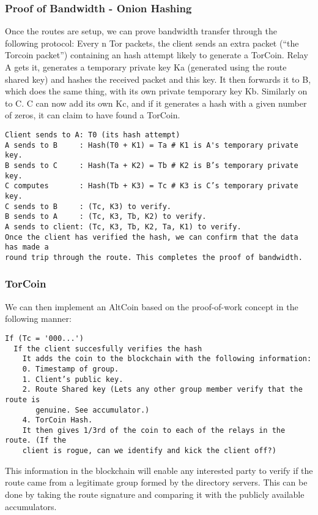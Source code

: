 \begin{enumerate}
\subsubsection{Proof of Bandwidth - Onion Hashing}
Once the routes are setup, we can prove bandwidth transfer through the following protocol:
Every n Tor packets, the client sends an extra packet (“the Torcoin packet”) containing an hash attempt likely to generate a TorCoin. Relay A gets it, generates a temporary private key Ka (generated using the route shared key) and hashes the received packet and this key. It then forwards it to B, which does the same thing, with its own private temporary key Kb. Similarly on to C. C can now add its own Kc, and if it generates a hash with a given number of zeros, it can claim to have found a TorCoin.
\begin{verbatim}
Client sends to A: T0 (its hash attempt)
A sends to B     : Hash(T0 + K1) = Ta # K1 is A's temporary private key.
B sends to C     : Hash(Ta + K2) = Tb # K2 is B’s temporary private key.
C computes       : Hash(Tb + K3) = Tc # K3 is C’s temporary private key.
C sends to B     : (Tc, K3) to verify.
B sends to A     : (Tc, K3, Tb, K2) to verify.
A sends to client: (Tc, K3, Tb, K2, Ta, K1) to verify.
Once the client has verified the hash, we can confirm that the data has made a 
round trip through the route. This completes the proof of bandwidth.
\end{verbatim}

\subsubsection{TorCoin}
We can then implement an AltCoin based on the proof-of-work concept in the following manner:
\begin{verbatim}
If (Tc = '000...')
  If the client succesfully verifies the hash
    It adds the coin to the blockchain with the following information:
    0. Timestamp of group.
    1. Client’s public key.
    2. Route Shared key (Lets any other group member verify that the route is 
       genuine. See accumulator.)
    4. TorCoin Hash.
    It then gives 1/3rd of the coin to each of the relays in the route. (If the 
    client is rogue, can we identify and kick the client off?)
\end{verbatim}
This information in the blockchain will enable any interested party to verify if the route came from a legitimate group formed by the directory servers. This can be done by taking the route signature and comparing it with the publicly available accumulators. 


\end{enumerate}
